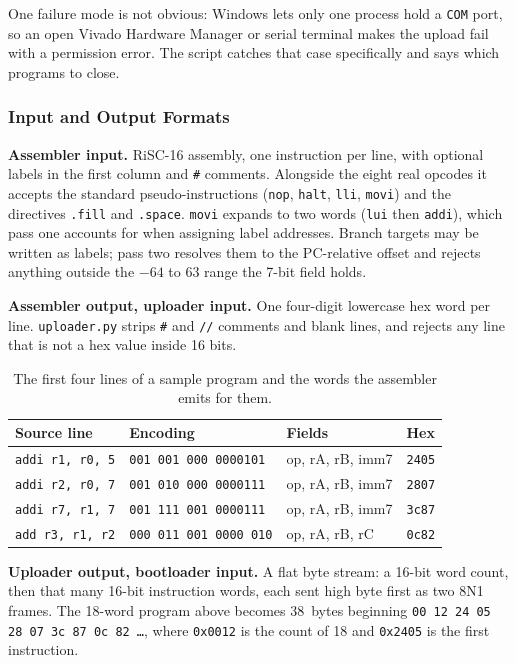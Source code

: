 \documentclass[11pt,letterpaper]{article}
\begin{document}
One failure mode is not obvious: Windows lets
only one process hold a \texttt{COM} port, so an open Vivado Hardware Manager
or serial terminal makes the upload fail with a permission error. The script
catches that case specifically and says which programs to close.

\subsubsection{Input and Output Formats}
\textbf{Assembler input.} RiSC-16 assembly, one instruction per line, with
optional labels in the first column and \texttt{\#} comments. Alongside the
eight real opcodes it accepts the standard pseudo-instructions
(\texttt{nop}, \texttt{halt}, \texttt{lli}, \texttt{movi}) and the directives
\texttt{.fill} and \texttt{.space}. \texttt{movi} expands to two words
(\texttt{lui} then \texttt{addi}), which pass one accounts for when assigning
label addresses. Branch targets may be written as labels; pass two resolves
them to the PC-relative offset and rejects anything outside the $-64$ to $63$
range the 7-bit field holds.

\textbf{Assembler output, uploader input.} One four-digit lowercase hex word
per line. \texttt{uploader.py} strips \texttt{\#} and \texttt{//} comments and
blank lines, and rejects any line that is not a hex value inside 16 bits.

\begin{table}[H]
  \centering
  \begin{tabular}{@{}llll@{}}
    \toprule
    \textbf{Source line} & \textbf{Encoding} & \textbf{Fields} & \textbf{Hex} \\
    \midrule
    \texttt{addi r1, r0, 5}  & \texttt{001\,001\,000\,0000101} & op, rA, rB, imm7 & \texttt{2405} \\
    \texttt{addi r2, r0, 7}  & \texttt{001\,010\,000\,0000111} & op, rA, rB, imm7 & \texttt{2807} \\
    \texttt{addi r7, r1, 7}  & \texttt{001\,111\,001\,0000111} & op, rA, rB, imm7 & \texttt{3c87} \\
    \texttt{add  r3, r1, r2} & \texttt{000\,011\,001\,0000\,010} & op, rA, rB, rC & \texttt{0c82} \\
    \bottomrule
  \end{tabular}
  \caption{The first four lines of a sample program and the words the
    assembler emits for them.}
\end{table}

\textbf{Uploader output, bootloader input.} A flat byte stream: a 16-bit word
count, then that many 16-bit instruction words, each sent high byte first as
two 8N1 frames. The 18-word program above becomes 38~bytes beginning
\texttt{00 12 24 05 28 07 3c 87 0c 82 \ldots}, where \texttt{0x0012} is the
count of 18 and \texttt{0x2405} is the first instruction.
\end{document}
